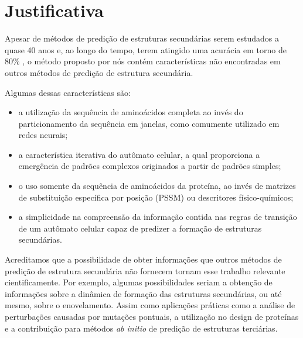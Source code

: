 \chapter{Justificativa}


Apesar de métodos de predição de estruturas secundárias serem estudados a quase 40 anos \cite{Chou1977a,Garnier1978} e, ao longo do tempo, terem atingido uma acurácia em torno de 80\% \cite{Faraggi2012a}, o método proposto por nós contém características não encontradas em outros métodos de predição de estrutura secundária.


Algumas dessas características são:

\begin{itemize}
	\item a utilização da sequência de aminoácidos completa ao invés do particionamento da sequência em janelas, como comumente utilizado em redes neurais;
	\item a característica iterativa do autômato celular, a qual proporciona a emergência de padrões complexos originados a partir de padrões simples;
	\item o uso somente da sequência de aminoácidos da proteína, ao invés de matrizes de substituição específica por posição (PSSM) ou descritores físico-químicos;
	\item a simplicidade na compreensão da informação contida nas regras de transição de um autômato celular capaz de predizer a formação de estruturas secundárias. 
\end{itemize}

Acreditamos que a possibilidade de obter informações que outros métodos de predição de estrutura secundária não fornecem tornam esse trabalho relevante cientificamente. Por exemplo, algumas possibilidades seriam a obtenção de informações sobre a dinâmica de formação das estruturas secundárias, ou até mesmo, sobre o enovelamento. Assim como aplicações práticas como a análise de perturbações causadas por mutações pontuais, a utilização no design de proteínas e a contribuição para métodos \textit{ab initio} de predição de estruturas terciárias.


